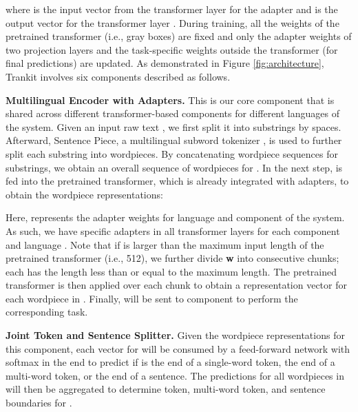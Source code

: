\documentclass[11pt,a4paper]{article}
\begin{document}
where  is the input vector from the transformer layer for the adapter and  is the output vector for the transformer layer . During training, all the weights of the pretrained transformer (i.e., gray boxes) are fixed and only the adapter weights of two projection layers and the task-specific weights outside the transformer (for final predictions) are updated. As demonstrated in Figure \ref{fig:architecture}, Trankit involves six components described as follows.







\vspace{0.3cm}

\noindent \textbf{Multilingual Encoder with Adapters.} This is our core component that is shared across different transformer-based components for different languages of the system. Given an input raw text , we first split it into substrings by spaces. Afterward, Sentence Piece, a multilingual subword tokenizer \citep{kudo-richardson-2018-sentencepiece,kudo-2018-subword}, is used to further split each substring into wordpieces. By concatenating wordpiece sequences for substrings, we obtain an overall sequence of wordpieces  for . In the next step,  is fed into the pretrained transformer, which is already integrated with adapters, to obtain the wordpiece representations:

Here,  represents the adapter weights for language  and component  of the system. As such, we have specific adapters in all transformer layers for each component  and language . Note that if  is larger than the maximum input length of the pretrained transformer (i.e., 512), we further divide \textbf{w} into consecutive chunks; each has the length less than or equal to the maximum length. The pretrained transformer is then applied over each chunk to obtain a representation vector for each wordpiece in . Finally,  will be sent to component  to perform the corresponding task.



\vspace{0.3cm}

\noindent \textbf{Joint Token and Sentence Splitter.} Given the wordpiece representations  for this component, each vector  for  will be consumed by a feed-forward network with softmax in the end to predict if  is the end of a single-word token, the end of a multi-word token, or the end of a sentence. The predictions for all wordpieces in  will then be aggregated to determine token, multi-word token, and sentence boundaries for .
\end{document}
